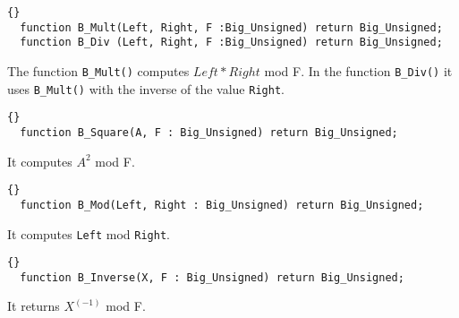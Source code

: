 \hhline
\begin{lstlisting}{}
  function B_Mult(Left, Right, F :Big_Unsigned) return Big_Unsigned;
  function B_Div (Left, Right, F :Big_Unsigned) return Big_Unsigned;
\end{lstlisting}
The function \texttt{B\_Mult()} computes $Left*Right$ mod F. In the
function \texttt{B\_Div()} it uses \texttt{B\_Mult()} with the inverse
of the value \texttt{Right}.

\hhline
\begin{lstlisting}{}
  function B_Square(A, F : Big_Unsigned) return Big_Unsigned;
\end{lstlisting}
It computes $A^2$ mod F.

\hhline
\begin{lstlisting}{}
  function B_Mod(Left, Right : Big_Unsigned) return Big_Unsigned;
\end{lstlisting}
It computes \texttt{Left} mod \texttt{Right}.

\hhline
\begin{lstlisting}{}
  function B_Inverse(X, F : Big_Unsigned) return Big_Unsigned;
\end{lstlisting}
It returns $X^{(-1)}$ mod F.

